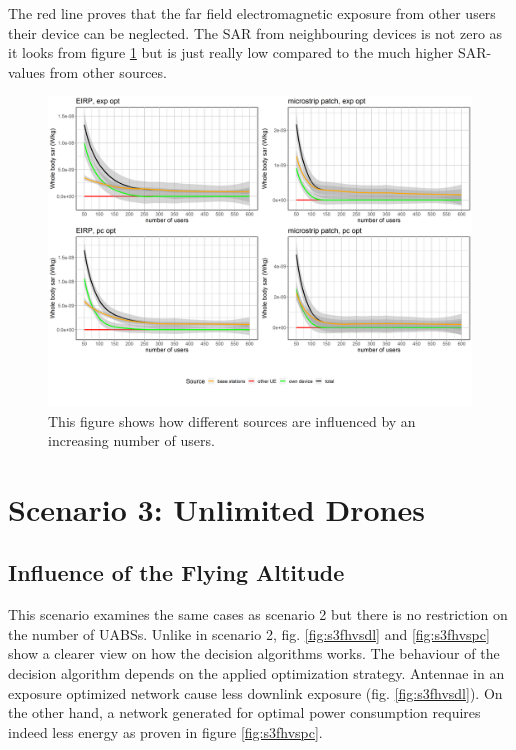 The red line proves that the far field electromagnetic exposure from other users their device can be neglected. The \gls{SAR} from 
neighbouring devices is not zero as it looks from figure \ref{fig:s2fourSourcesMatrix} but is just really low compared to the much higher
\gls{SAR}-values from other sources.

\begin{figure}[h!]
  \includegraphics[width=\textwidth]{../results/s2/uFourSources.png}
  \caption{This figure shows how different sources are influenced by an increasing number of users. }
  \label{fig:s2fourSourcesMatrix}
\end{figure}

\section{Scenario 3: Unlimited Drones}
\subsection{Influence of the Flying Altitude}
\label{S3A}

This scenario examines the same cases as scenario 2 but there is no restriction on the number of \gls{UABS}s. 
Unlike in scenario 2, fig. \ref{fig:s3fhvsdl} and \ref{fig:s3fhvspc} show a clearer view on how the decision algorithms
works. 
The behaviour of the decision algorithm depends on the applied optimization strategy. 
Antennae in an exposure optimized network cause less downlink exposure (fig. \ref{fig:s3fhvsdl}). On the other hand, 
a network generated for optimal power consumption requires indeed less energy as proven in figure \ref{fig:s3fhvspc}. 

